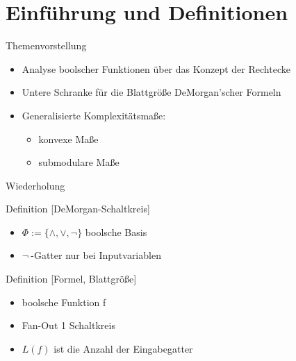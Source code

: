 \section{Einführung und Definitionen}

\begin{frame}
    \begin{block}{Themenvorstellung}
        \begin{itemize}
            \item Analyse boolscher Funktionen über das Konzept der Rechtecke
            \item Untere Schranke für die Blattgröße DeMorgan'scher Formeln
            \item Generalisierte Komplexitätsmaße:
                \begin{itemize}
                    \item konvexe Maße
                    \item submodulare Maße
                \end{itemize}
        \end{itemize}
    \end{block}
\end{frame}

\begin{frame}{Wiederholung}
    \begin{block}{Definition [DeMorgan-Schaltkreis]}
        \begin{itemize}
            \item $\Phi := \{ \wedge, \vee, \neg \}$ boolsche Basis
            \item $\neg\ $-Gatter nur bei Inputvariablen
        \end{itemize}
        
        
    \end{block}
    \begin{block}{Definition [Formel, Blattgröße]}
        \begin{itemize}
            \item boolsche Funktion f
            \item Fan-Out 1 Schaltkreis
            \item $L(f)$ ist die Anzahl der Eingabegatter
        \end{itemize}
        
        
    \end{block}
\end{frame}

